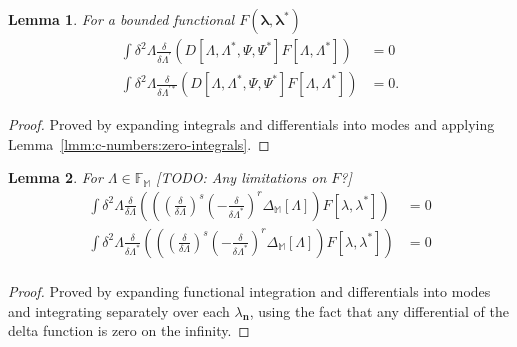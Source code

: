 \documentclass[12pt,aip,jmp,amssymb,amsmath]{revtex4-1}
\newtheorem{lemma}{Lemma}
\begin{document}
\begin{lemma}
\label{lmm:func-calculus:zero-integrals}
    For a bounded functional $F(\boldsymbol{\lambda}, \boldsymbol{\lambda}^*)$
    \begin{eqnarray*}
        \int \delta^2\Lambda
            \frac{\delta}{\delta \Lambda^\prime} \left(
                D[\Lambda, \Lambda^*, \Psi, \Psi^*]
                F[\Lambda, \Lambda^*]
            \right)
        & = 0 \\
        \int \delta^2\Lambda
            \frac{\delta}{\delta \Lambda^{\prime*}}
            \left(
                D[\Lambda, \Lambda^*, \Psi, \Psi^*]
                F[\Lambda, \Lambda^*]
            \right)
        & = 0.
    \end{eqnarray*}
\end{lemma}
\begin{proof}
Proved by expanding integrals and differentials into modes and applying Lemma~\ref{lmm:c-numbers:zero-integrals}.
\end{proof}

\begin{lemma}
\label{lmm:func-calculus:zero-delta-integrals}
    For $\Lambda \in \mathbb{F}_{\mathbb{M}}$ [TODO: Any limitations on $F$?]
    \begin{eqnarray*}
        \int \delta^2\Lambda
            \frac{\delta}{\delta \Lambda} \left(
                \left(
                    \left( \frac{\delta}{\delta \Lambda} \right)^s
                    \left( -\frac{\delta}{\delta \Lambda^*} \right)^r
                    \Delta_{\mathbb{M}}[\Lambda]
                \right)
                F[\lambda, \lambda^*]
            \right)
        & = 0 \\
        \int \delta^2\Lambda
            \frac{\delta}{\delta \Lambda^*} \left(
                \left(
                    \left( \frac{\delta}{\delta \Lambda} \right)^s
                    \left( -\frac{\delta}{\delta \Lambda^*} \right)^r
                    \Delta_{\mathbb{M}}[\Lambda]
                \right)
                F[\lambda, \lambda^*]
            \right)
        & = 0 \\
    \end{eqnarray*}
\end{lemma}
\begin{proof}
Proved by expanding functional integration and differentials into modes and integrating separately over each $\lambda_{\boldsymbol{n}}$, using the fact that any differential of the delta function is zero on the infinity.
\end{proof}
\end{document}
